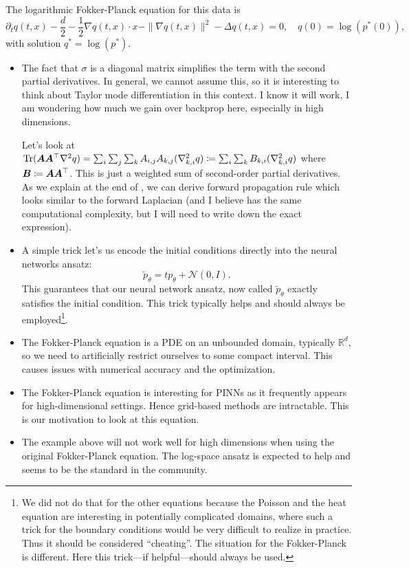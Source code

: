 The logarithmic Fokker-Planck equation for this data is
\begin{equation}\label{eq:log-fokker-planck-isotropic-gaussian}
  \partial_t q(t,x)
  -
  \frac d2
  -
  \frac12\nabla q(t,x)\cdot x
  -
  \| \nabla q(t,x) \|^2
  -
  \Delta q(t,x)
  =
  0,
  \quad
  q(0) = \log(p^*(0)),
\end{equation}
with solution $q^* = \log(p^*)$.

\begin{itemize}
\item The fact that $\sigma$ is a diagonal matrix simplifies the term with the second partial derivatives. In general, we cannot assume this, so it is interesting to think about Taylor mode differentiation in this context. I know it will work, I am wondering how much we gain over backprop here, especially in high dimensions.

  Let's look at $\operatorname{Tr}({\bm{A}} {\bm{A}}^\top \nabla^2 q) = \sum_i \sum_j \sum_k {A}_{i,j} {A}_{k,j} (\nabla^2_{k,i} q) \coloneqq \sum_i \sum_k {B}_{k,i} (\nabla^2_{k,i} q)$ where ${\bm{B}} \coloneqq {\bm{A}} {\bm{A}}^\top$. This is just a weighted sum of second-order partial derivatives. As we explain at the end of , we can derive forward propagation rule which looks similar to the forward Laplacian (and I believe has the same computational complexity, but I will need to write down the exact expression).


\item A simple trick let's us encode the initial conditions directly into the neural networks ansatz:
  \begin{equation}
    \tilde p_\theta = t p_\theta + \mathcal N(0, I).
  \end{equation}
  This guarantees that our neural network ansatz, now called $\tilde p_\theta$ exactly satisfies the initial condition. This trick typically helps and should always be employed\footnote{We did not do that for the other equations because the Poisson and the heat equation are interesting in potentially complicated domains, where such a trick for the boundary conditions would be very difficult to realize in practice. Thus it should be considered ``cheating''. The situation for the Fokker-Planck is different. Here this trick---if helpful---should always be used.}.
\item The Fokker-Planck equation is a PDE on an unbounded domain, typically $\mathbb R^d$, so we need to artificially restrict ourselves to some compact interval. This causes issues with numerical accuracy and the optimization.
\item The Fokker-Planck equation is interesting for PINNs as it frequently appears for high-dimensional settings. Hence grid-based methods are intractable. This is our motivation to look at this equation.
\item The example above will not work well for high dimensions when using the original Fokker-Planck equation. The log-space ansatz is expected to help and seems to be the standard in the community.
\end{itemize}

